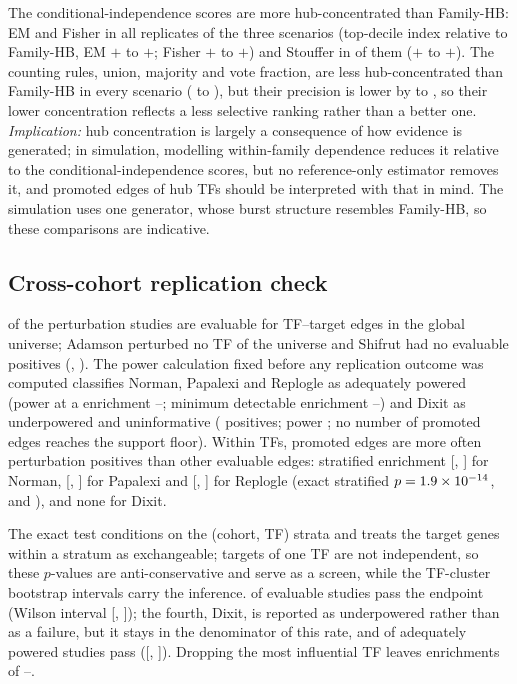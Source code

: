 The conditional-independence scores are more hub-concentrated than Family-HB: EM and Fisher in all \nSimHubRepAll{} replicates of the three scenarios (top-decile index relative to Family-HB, EM $+$\nSimEmHbMin{} to $+$\nSimEmHbMax{}; Fisher $+$\nSimFiHbMin{} to $+$\nSimFiHbMax{}) and Stouffer in \nSimStGtN{} of them ($+$\nSimStHbMin{} to $+$\nSimStHbMax{}).
The counting rules, union, majority and vote fraction, are less hub-concentrated than Family-HB in every scenario (\nSimCountHbMin{} to \nSimCountHbMax{}), but their precision is lower by \nSimCountPrecLossMin{} to \nSimCountPrecLossMax{}, so their lower concentration reflects a less selective ranking rather than a better one.
\emph{Implication:} hub concentration is largely a consequence of how evidence is generated; in simulation, modelling within-family dependence reduces it relative to the conditional-independence scores, but no reference-only estimator removes it, and promoted edges of hub TFs should be interpreted with that in mind. The simulation uses one generator, whose burst structure resembles Family-HB, so these comparisons are indicative.


\subsection{Cross-cohort replication check}\label{sec:res-replication}

\nRepNEvalCap{} of the \nCohStudies{} perturbation studies are evaluable for TF--target edges in the global universe; Adamson perturbed no TF of the universe and Shifrut had no evaluable positives (, ).
The power calculation fixed before any replication outcome was computed classifies Norman, Papalexi and Replogle as adequately powered (power at a \nRepTrueEnrFold{} enrichment \nRepPowMin{}--\nRepPowMax{}; minimum detectable enrichment \nRepMdeMin{}--\nRepMdeMax{}) and Dixit as underpowered and uninformative (\nRepDixitNpos{} positives; power \nRepDixitPow{}; no number of promoted edges reaches the support floor).
Within TFs, promoted edges are more often perturbation positives than other evaluable edges: stratified enrichment \nRepEnrNorman{} [\nRepEnrNormanLo{}, \nRepEnrNormanHi{}] for Norman, \nRepEnrPapalexi{} [\nRepEnrPapalexiLo{}, \nRepEnrPapalexiHi{}] for Papalexi and \nRepEnrReplogle{} [\nRepEnrReplogleLo{}, \nRepEnrReplogleHi{}] for Replogle (exact stratified $p=1.9\times10^{-14}{}$, \nRepPPapalexi{} and \nRepPReplogle{}), and none for Dixit.

The exact test conditions on the (cohort, TF) strata and treats the target genes within a stratum as exchangeable; targets of one TF are not independent, so these $p$-values are anti-conservative and serve as a screen, while the TF-cluster bootstrap intervals carry the inference.
\nRepPassAllNCap{} of \nRepPassAllD{} evaluable studies pass the endpoint (Wilson interval [\nRepPassAllLo{}, \nRepPassAllHi{}]); the fourth, Dixit, is reported as underpowered rather than as a failure, but it stays in the denominator of this rate, and \nRepPassPowN{} of \nRepPassPowD{} adequately powered studies pass ([\nRepPassPowLo{}, \nRepPassPowHi{}]).
Dropping the most influential TF leaves enrichments of \nRepDropTopMin{}--\nRepDropTopMax{}.


